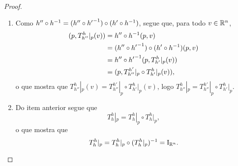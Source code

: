 \begin{proof}
	\begin{enumerate}
	\item Como $h'' \circ h^{-1} = (h'' \circ {h'}^{-1}) \circ (h' \circ h^{-1})$, segue que, para todo $v \in \mathbb{R}^n$,
		\begin{align*}
		(p,T^h_{h''}|_p(v)) &= h'' \circ h^{-1} (p,v) \\
			&= (h'' \circ {h'}^{-1}) \circ (h' \circ h^{-1}) (p,v) \\
			&= h'' \circ {h'}^{-1}(p,T^h_{h'}|_p(v)) \\
			&= (p,T^{h'}_{h''}|_p \circ T^h_{h'}|_p (v)),
		\end{align*}
o que mostra que $T^h_{h''}|_p(v) = T^{h'}_{h''}|_p \circ T^h_{h'}|_p (v)$, logo $T^h_{h''}|_p = T^{h'}_{h''}|_p \circ T^h_{h'}|_p$.

	\item Do item anterior segue que
		\begin{equation*}
		T^h_h|_p = T^h_h|_p \circ T^h_h|_p,
		\end{equation*}
o que mostra que
		\begin{equation*}
		T^h_h|_p = T^h_h|_p \circ (T^h_h|_p)^{-1} = \mathrm{I}_{\mathbb{R}^n}.
		\end{equation*}
	
\begin{comment}
Como $h \circ h\inv = \Id$, segue que, para todo $v \in \R^n$,
		\begin{equation*}
		(p,v) = h \circ h\inv(p,v) = (p,T^h_h|_p (v)),
		\end{equation*}
o que mostra que $v = T^h_h|_p (v)$, logo $T^h_h|_p = \Id_{\R^n}$.

	\item Dos itens anteriores segue que
		\begin{equation*}
		T^{h'}_h|_p \circ T_h^{h'}|_p = T^h_h|_p = \Id_{\R^n}
		\end{equation*}
e
		\begin{equation*}
		T^h_{h'}|_p \circ T^{h'}_h|_p = T^{h'}_{h'}|_p = \Id_{\R^n},
		\end{equation*}
logo $T^{h'}_h|_p = {T^h_{h'}|_p}\inv$.


\end{comment}
\end{enumerate}
\end{proof}
